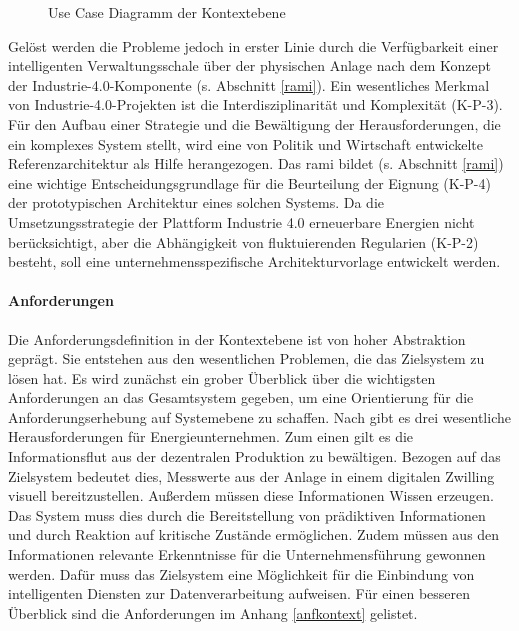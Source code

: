 \begin{figure}[ht!]
  \centering
  \noindent{}
  \caption[Use Case Diagramm der Kontextebene]{Use Case Diagramm der Kontextebene}
  \label{usecase_basic}
\end{figure}
\noindent Gelöst werden die Probleme jedoch in erster Linie durch die Verfügbarkeit einer intelligenten Verwaltungsschale über der physischen Anlage nach dem Konzept der Industrie-4.0-Komponente (s. Abschnitt \ref{rami}).
Ein wesentliches Merkmal von Industrie-4.0-Projekten ist die Interdisziplinarität und Komplexität (K-P-3). Für den Aufbau einer Strategie und die Bewältigung der Herausforderungen, die ein komplexes System stellt, wird eine von Politik und Wirtschaft entwickelte Referenzarchitektur als Hilfe herangezogen. Das \ac{rami} bildet (s. Abschnitt \ref{rami}) eine wichtige Entscheidungsgrundlage für die Beurteilung der Eignung (K-P-4) der prototypischen Architektur eines solchen Systems. Da die Umsetzungsstrategie der Plattform Industrie 4.0 \citep{BITKOM2015} erneuerbare Energien nicht berücksichtigt, aber die Abhängigkeit von fluktuierenden Regularien (K-P-2) besteht, soll eine unternehmensspezifische Architekturvorlage entwickelt werden.


\paragraph{Anforderungen}

Die Anforderungsdefinition in der Kontextebene ist von hoher Abstraktion geprägt. Sie entstehen aus den wesentlichen Problemen, die das Zielsystem zu lösen hat. Es wird zunächst ein grober Überblick über die wichtigsten Anforderungen an das Gesamtsystem gegeben, um eine Orientierung für die Anforderungserhebung auf Systemebene zu schaffen. Nach \citet{Doleski2016} gibt es drei wesentliche Herausforderungen für Energieunternehmen. Zum einen gilt es die Informationsflut aus der dezentralen Produktion zu bewältigen. Bezogen auf das Zielsystem bedeutet dies, Messwerte aus der Anlage in einem digitalen Zwilling visuell bereitzustellen. Außerdem müssen diese Informationen Wissen erzeugen. Das System muss dies durch die Bereitstellung von prädiktiven Informationen und durch Reaktion auf kritische Zustände ermöglichen. Zudem müssen aus den Informationen relevante Erkenntnisse für die Unternehmensführung gewonnen werden. Dafür muss das Zielsystem eine Möglichkeit für die Einbindung von intelligenten Diensten zur Datenverarbeitung aufweisen. Für einen besseren Überblick sind die Anforderungen im Anhang  \ref{anfkontext} gelistet.


